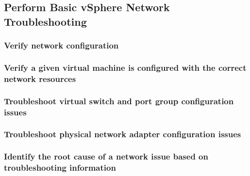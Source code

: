 \subsection{Perform Basic vSphere Network Troubleshooting}

\subsubsection{Verify network configuration}

\subsubsection{Verify a given virtual machine is configured with the correct network resources}

\subsubsection{Troubleshoot virtual switch and port group configuration issues}

\subsubsection{Troubleshoot physical network adapter configuration issues}

\subsubsection{Identify the root cause of a network issue based on troubleshooting information}
